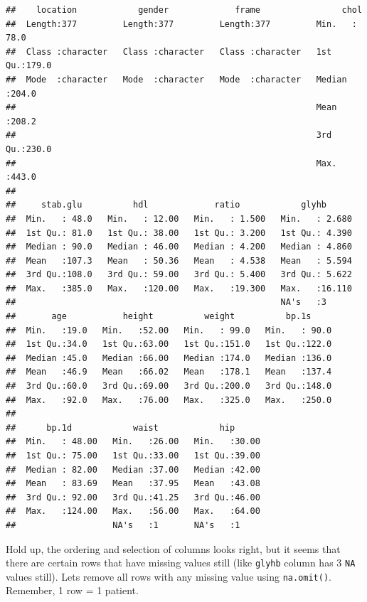 \documentclass[
]{book}
\begin{document}
\begin{verbatim}
##    location            gender             frame                chol      
##  Length:377         Length:377         Length:377         Min.   : 78.0  
##  Class :character   Class :character   Class :character   1st Qu.:179.0  
##  Mode  :character   Mode  :character   Mode  :character   Median :204.0  
##                                                           Mean   :208.2  
##                                                           3rd Qu.:230.0  
##                                                           Max.   :443.0  
##                                                                          
##     stab.glu          hdl             ratio            glyhb       
##  Min.   : 48.0   Min.   : 12.00   Min.   : 1.500   Min.   : 2.680  
##  1st Qu.: 81.0   1st Qu.: 38.00   1st Qu.: 3.200   1st Qu.: 4.390  
##  Median : 90.0   Median : 46.00   Median : 4.200   Median : 4.860  
##  Mean   :107.3   Mean   : 50.36   Mean   : 4.538   Mean   : 5.594  
##  3rd Qu.:108.0   3rd Qu.: 59.00   3rd Qu.: 5.400   3rd Qu.: 5.622  
##  Max.   :385.0   Max.   :120.00   Max.   :19.300   Max.   :16.110  
##                                                    NA's   :3       
##       age           height          weight          bp.1s      
##  Min.   :19.0   Min.   :52.00   Min.   : 99.0   Min.   : 90.0  
##  1st Qu.:34.0   1st Qu.:63.00   1st Qu.:151.0   1st Qu.:122.0  
##  Median :45.0   Median :66.00   Median :174.0   Median :136.0  
##  Mean   :46.9   Mean   :66.02   Mean   :178.1   Mean   :137.4  
##  3rd Qu.:60.0   3rd Qu.:69.00   3rd Qu.:200.0   3rd Qu.:148.0  
##  Max.   :92.0   Max.   :76.00   Max.   :325.0   Max.   :250.0  
##                                                                
##      bp.1d            waist            hip       
##  Min.   : 48.00   Min.   :26.00   Min.   :30.00  
##  1st Qu.: 75.00   1st Qu.:33.00   1st Qu.:39.00  
##  Median : 82.00   Median :37.00   Median :42.00  
##  Mean   : 83.69   Mean   :37.95   Mean   :43.08  
##  3rd Qu.: 92.00   3rd Qu.:41.25   3rd Qu.:46.00  
##  Max.   :124.00   Max.   :56.00   Max.   :64.00  
##                   NA's   :1       NA's   :1
\end{verbatim}

Hold up, the ordering and selection of columns looks right, but it seems that there are certain rows that have missing values still (like \texttt{glyhb} column has 3 \texttt{NA} values still).
Lets remove all rows with any missing value using \texttt{na.omit()}.
Remember, 1 row = 1 patient.
\end{document}
